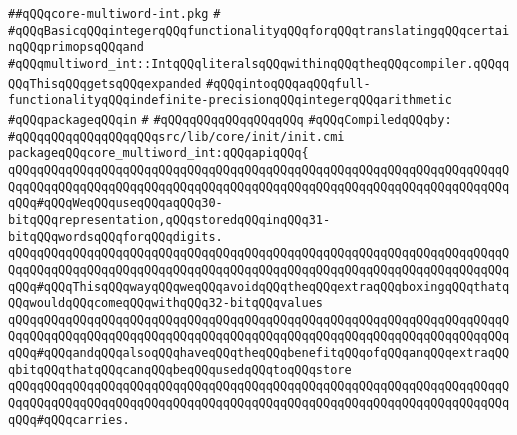 \label{src/lib/core/init/core-multiword-int.pkg}
\verb|##qQQqcore-multiword-int.pkg|\newline
\verb|#|\newline
\verb|#qQQqBasicqQQqintegerqQQqfunctionalityqQQqforqQQqtranslatingqQQqcertainqQQqprimopsqQQqand|\newline
\verb|#qQQqmultiword_int::IntqQQqliteralsqQQqwithinqQQqtheqQQqcompiler.qQQqqQQqThisqQQqgetsqQQqexpanded|\newline
\verb|#qQQqintoqQQqaqQQqfull-functionalityqQQqindefinite-precisionqQQqintegerqQQqarithmetic|\newline
\verb|#qQQqpackageqQQqin|\newline
\verb|#|\newline
\verb|#qQQqqQQqqQQqqQQqqQQq|\newline
\newline
\verb|#qQQqCompiledqQQqby:|\newline
\verb|#qQQqqQQqqQQqqQQqqQQqsrc/lib/core/init/init.cmi|\newline
\newline
\newline
\newline
\newline
\newline
\newline
\verb|packageqQQqcore_multiword_int:qQQqapiqQQq{|\newline
\newline
\verb|qQQqqQQqqQQqqQQqqQQqqQQqqQQqqQQqqQQqqQQqqQQqqQQqqQQqqQQqqQQqqQQqqQQqqQQqqQQqqQQqqQQqqQQqqQQqqQQqqQQqqQQqqQQqqQQqqQQqqQQqqQQqqQQqqQQqqQQqqQQqqQQq#qQQqWeqQQquseqQQqaqQQq30-bitqQQqrepresentation,qQQqstoredqQQqinqQQq31-bitqQQqwordsqQQqforqQQqdigits.|\newline
\verb|qQQqqQQqqQQqqQQqqQQqqQQqqQQqqQQqqQQqqQQqqQQqqQQqqQQqqQQqqQQqqQQqqQQqqQQqqQQqqQQqqQQqqQQqqQQqqQQqqQQqqQQqqQQqqQQqqQQqqQQqqQQqqQQqqQQqqQQqqQQqqQQq#qQQqThisqQQqwayqQQqweqQQqavoidqQQqtheqQQqextraqQQqboxingqQQqthatqQQqwouldqQQqcomeqQQqwithqQQq32-bitqQQqvalues|\newline
\verb|qQQqqQQqqQQqqQQqqQQqqQQqqQQqqQQqqQQqqQQqqQQqqQQqqQQqqQQqqQQqqQQqqQQqqQQqqQQqqQQqqQQqqQQqqQQqqQQqqQQqqQQqqQQqqQQqqQQqqQQqqQQqqQQqqQQqqQQqqQQqqQQq#qQQqandqQQqalsoqQQqhaveqQQqtheqQQqbenefitqQQqofqQQqanqQQqextraqQQqbitqQQqthatqQQqcanqQQqbeqQQqusedqQQqtoqQQqstore|\newline
\verb|qQQqqQQqqQQqqQQqqQQqqQQqqQQqqQQqqQQqqQQqqQQqqQQqqQQqqQQqqQQqqQQqqQQqqQQqqQQqqQQqqQQqqQQqqQQqqQQqqQQqqQQqqQQqqQQqqQQqqQQqqQQqqQQqqQQqqQQqqQQqqQQq#qQQqcarries.|\newline
